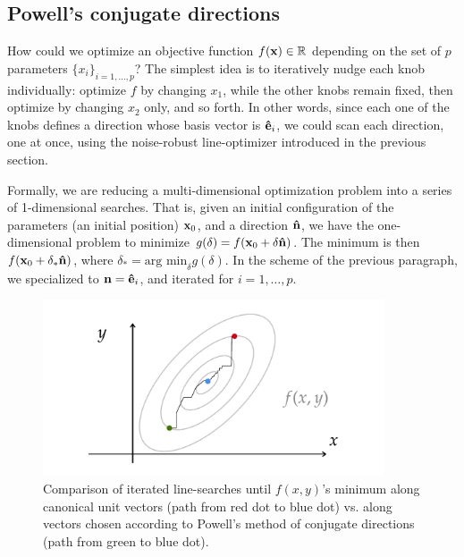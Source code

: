 \subsection{Powell's conjugate directions}
How could we optimize an objective function $f(\vb{x})\in\mathbb{R}$ depending on the set of $p$ parameters $\{x_i\}_{i=1,\dots,p}$? The simplest idea is to iteratively nudge each knob individually: optimize $f$ by changing $x_1$, while the other knobs remain fixed, then optimize by changing $x_2$ only, and so forth. In other words, since each one of the knobs defines a direction whose basis vector is $\vu{e}_i$, we could scan each direction, one at once, using the noise-robust line-optimizer introduced in the previous section.

Formally, we are reducing a multi-dimensional optimization problem into a series of 1-dimensional searches. That is, given an initial configuration of the parameters (an initial position) $\vb{x}_0$, and a direction $\vu{n}$, we have the one-dimensional problem to minimize $g(\delta)=f(\vb{x}_0 + \delta \vu{n})$. The minimum is  then $f(\vb{x}_0 + \delta_* \vu{n})$, where $\delta_* = \text{arg min}_\delta g(\delta)$. In the scheme of the previous paragraph, we specialized to $\vb{n}=\vu{e}_i$, and iterated for $i=1,\dots, p$.

\begin{figure}[htb]
    \centering
    \includegraphics[width=0.9\textwidth]{Images/powell_loop.pdf}
    \caption[Comparison of iterated line-searches until $f(x,y)$'s minimum along canonical unit vectors vs. along vectors chosen according to Powell's method.]{Comparison of iterated line-searches until $f(x,y)$'s minimum along canonical unit vectors (path from red dot to blue dot) vs. along vectors chosen according to Powell's method of conjugate directions (path from green to blue dot).}
    \label{fig:powell}
\end{figure}


